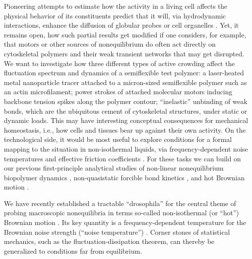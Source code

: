 \begin{workpackage}[id=WPactive,wphases=0-48,
  short=Active Particle Suspensions,%
  title=Probing active particle suspensions with colloids and polymers,
  lead=ULEI,
  ULEIRM=96,UNIPDRM=6,USTUTTRM=2]
\begin{tasklist}
\begin{task}[title=Active Crowding,id=task2,lead=ULEI,partners={KUL},wphases=0-48!0.5]
Pioneering attempts to estimate how the activity in a living cell affects the physical behavior
of its constituents predict that it will, via hydrodynamic interactions, enhance the diffusion of
globular probes or cell organelles \cite{mikhailov-kapral:2015}.
%
Yet, it remains open, how such partial results get modified if one considers, for example, that motors or
other sources of nonequilibrium do often act directly on cytoskeletal polymers and their
weak transient networks that may get disrupted.
%
We want to  investigate how three different types of active
crowding affect the fluctuation spectrum and dynamics of a semiflexible test polymer: a
laser-heated metal nanoparticle tracer attached to a micron-sized semiflexible polymer such
as an actin microfilament; power strokes of attached molecular
motors inducing backbone tension spikes along the polymer contour; ``inelastic'' \cite{gralka-kroy:2015}
unbinding of weak bonds, which are the ubiquitous cement of
cytoskeletal structures, under static or dynamic loads.
%
This may have interesting conceptual consequences for mechanical homeostasis, i.e., how cells and tissues bear up against 
their own activity.   
%
On the technological side, it would be most useful to explore conditions for a formal mapping to the situation in 
non-isothermal liquids, via frequency-dependent noise temperatures and 
effective friction coefficients \cite{falasco-etal:2014}.
%
For these tasks we can build on our previous first-principle analytical studies
of non-linear nonequilibrium biopolymer dynamics \cite{otto-etal:2013}, non-quasistatic forcible 
bond kinetics \cite{bullerjahn-sturm-kroy:2014}, and hot Brownian motion 
\cite{rings-etal:2010,falasco-etal:2014}.

\end{task}


\begin{task}[title=Noise Temperature,id=task3,lead=ULEI,wphases=0-24!0.5]
We have recently established a tractable ``drosophila'' for the central theme of probing 
macroscopic nonequilibria in terms so-called non-isothermal (or ``hot'') Brownian motion \cite{rings-etal:2010}.
%
Its key quantity is a frequency-dependent temperature for the Brownian noise 
strength (``noise temperature'') \cite{falasco-etal:2014}.
%
Corner stones of statistical mechanics, such as the fluctuation-dissipation theorem, can
thereby be generalized to conditions far from equilibrium.  


\end{task}
\end{tasklist}
\end{workpackage}
